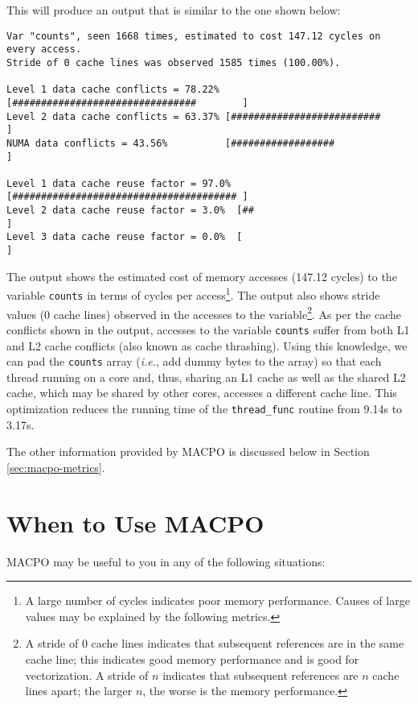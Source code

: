 This will produce an output that is similar to the one shown below:
\begin{lstlisting}[breaklines]
Var "counts", seen 1668 times, estimated to cost 147.12 cycles on every access.
Stride of 0 cache lines was observed 1585 times (100.00%).

Level 1 data cache conflicts = 78.22% [################################        ]
Level 2 data cache conflicts = 63.37% [##########################              ]
NUMA data conflicts = 43.56%          [##################                      ]

Level 1 data cache reuse factor = 97.0% [####################################### ]
Level 2 data cache reuse factor = 3.0%  [##                                      ]
Level 3 data cache reuse factor = 0.0%  [                                        ]
\end{lstlisting}

The output shows the estimated cost of memory accesses (147.12 cycles) to the variable \texttt{counts} in terms of cycles per access\footnote{A large number of cycles indicates poor memory performance. Causes of large values may be explained by the following metrics.}. The output also shows stride values (0 cache lines) observed in the accesses to the variable\footnote{A stride of 0 cache lines indicates that subsequent references are in the same cache line; this indicates good memory performance and is good for vectorization. A stride of $n$ indicates that subsequent references are $n$ cache lines apart; the larger $n$, the worse is the memory performance.}. As per the cache conflicts shown in the output, accesses to the variable \texttt{counts} suffer from both L1 and L2 cache conflicts (also known as cache thrashing). Using this knowledge, we can pad the \texttt{counts} array (\textit{i.e.}, add dummy bytes to the array) so that each thread running on a core and, thus, sharing an L1 cache as well as the shared L2 cache, which may be shared by other cores, accesses a different cache line. This optimization reduces the running time of the \texttt{thread\_func} routine from 9.14s to 3.17s.

The other information provided by MACPO is discussed below in Section \ref{sec:macpo-metrics}.

\section{When to Use MACPO}

MACPO may be useful to you in any of the following situations:

